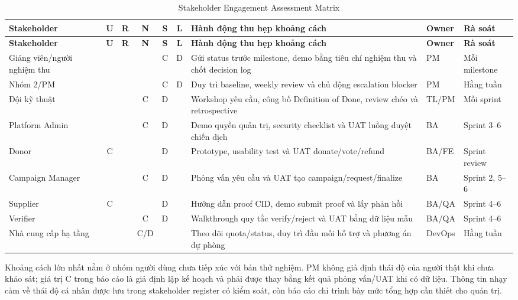 \begin{landscape}
\begin{longtable}{| p{3.2cm} | c | c | c | c | c | p{5.8cm} | p{2.5cm} | p{2.5cm} |}
\caption{Stakeholder Engagement Assessment Matrix}\label{tab:stakeholder-engagement}\\
\hline
\textbf{Stakeholder} & \textbf{U} & \textbf{R} & \textbf{N} & \textbf{S} & \textbf{L} & \textbf{Hành động thu hẹp khoảng cách} & \textbf{Owner} & \textbf{Rà soát} \\
\hline
\endfirsthead
\hline
\textbf{Stakeholder} & \textbf{U} & \textbf{R} & \textbf{N} & \textbf{S} & \textbf{L} & \textbf{Hành động thu hẹp khoảng cách} & \textbf{Owner} & \textbf{Rà soát} \\
\hline
\endhead
Giảng viên/người nghiệm thu & & & & C & D & Gửi status trước milestone, demo bằng tiêu chí nghiệm thu và chốt decision log & PM & Mỗi milestone \\ \hline
Nhóm 2/PM & & & & C & D & Duy trì baseline, weekly review và chủ động escalation blocker & PM & Hằng tuần \\ \hline
Đội kỹ thuật & & & C & D & & Workshop yêu cầu, công bố Definition of Done, review chéo và retrospective & TL/PM & Mỗi sprint \\ \hline
Platform Admin & & & C & D & & Demo quyền quản trị, security checklist và UAT luồng duyệt chiến dịch & BA & Sprint 3--6 \\ \hline
Donor & C & & & D & & Prototype, usability test và UAT donate/vote/refund & BA/FE & Sprint review \\ \hline
Campaign Manager & & & C & D & & Phỏng vấn yêu cầu và UAT tạo campaign/request/finalize & BA & Sprint 2, 5--6 \\ \hline
Supplier & C & & & D & & Hướng dẫn proof CID, demo submit proof và lấy phản hồi & BA/QA & Sprint 4--6 \\ \hline
Verifier & & & C & D & & Walkthrough quy tắc verify/reject và UAT bằng dữ liệu mẫu & BA/QA & Sprint 4--6 \\ \hline
Nhà cung cấp hạ tầng & & & C/D & & & Theo dõi quota/status, duy trì đầu mối hỗ trợ và phương án dự phòng & DevOps & Hằng tuần \\
\hline
\end{longtable}
\end{landscape}

Khoảng cách lớn nhất nằm ở nhóm người dùng chưa tiếp xúc với bản thử nghiệm. PM không giả định thái độ của người thật khi chưa khảo sát; giá trị C trong báo cáo là giả định lập kế hoạch và phải được thay bằng kết quả phỏng vấn/UAT khi có dữ liệu. Thông tin nhạy cảm về thái độ cá nhân được lưu trong stakeholder register có kiểm soát, còn báo cáo chỉ trình bày mức tổng hợp cần thiết cho quản trị.

